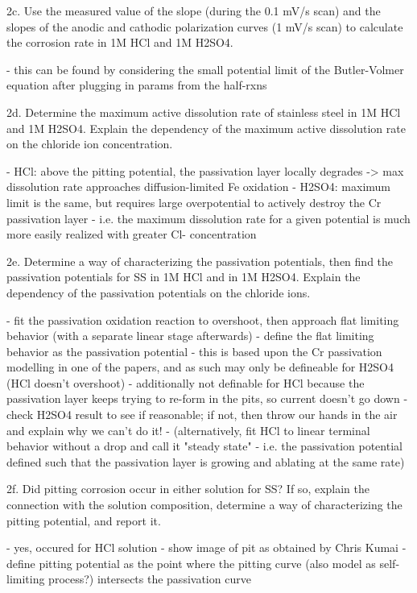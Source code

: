 2c. Use the measured value of the slope (during the 0.1 mV/s scan) and the slopes of the anodic and cathodic polarization curves (1 mV/s scan) to calculate the corrosion rate in 1M HCl and 1M H2SO4.

	- this can be found by considering the small potential limit of the Butler-Volmer equation after plugging in params from the half-rxns

2d. Determine the maximum active dissolution rate of stainless steel in 1M HCl and 1M H2SO4.  Explain the dependency of the maximum active dissolution rate on the chloride ion concentration.

	- HCl: above the pitting potential, the passivation layer locally degrades -> max dissolution rate approaches diffusion-limited Fe oxidation
	- H2SO4: maximum limit is the same, but requires large overpotential to actively destroy the Cr passivation layer
	- i.e. the maximum dissolution rate for a given potential is much more easily realized with greater Cl- concentration

2e. Determine a way of characterizing the passivation potentials, then find the passivation potentials for SS in 1M HCl and in 1M H2SO4.  Explain the dependency of the passivation potentials on the chloride ions.

	- fit the passivation oxidation reaction to overshoot, then approach flat limiting behavior (with a separate linear stage afterwards)
	- define the flat limiting behavior as the passivation potential
	- this is based upon the Cr passivation modelling in one of the papers, and as such may only be defineable for H2SO4 (HCl doesn't overshoot)
	- additionally not definable for HCl because the passivation layer keeps trying to re-form in the pits, so current doesn't go down
	- check H2SO4 result to see if reasonable; if not, then throw our hands in the air and explain why we can't do it!
	- (alternatively, fit HCl to linear terminal behavior without a drop and call it "steady state"
	- i.e. the passivation potential defined such that the passivation layer is growing and ablating at the same rate)

2f. Did pitting corrosion occur in either solution for SS?  If so, explain the connection with the solution composition, determine a way of characterizing the pitting potential, and report it.

	- yes, occured for HCl solution
	- show image of pit as obtained by Chris Kumai
	- define pitting potential as the point where the pitting curve (also model as self-limiting process?) intersects the passivation curve

